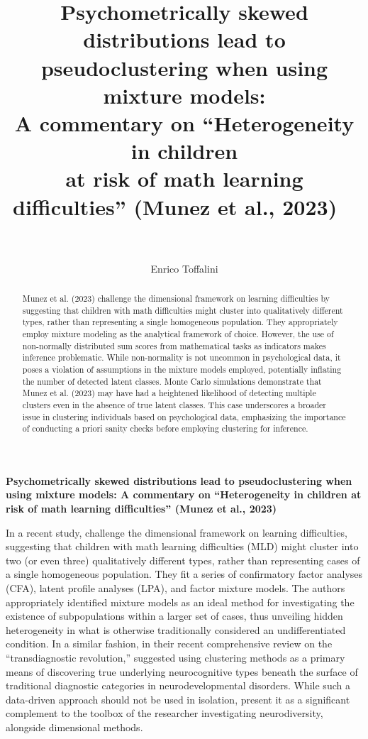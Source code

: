 \documentclass[letterpaper,11pt]{article}
\title{%
  \LARGE Psychometrically skewed distributions lead to pseudoclustering when using mixture models: \\ 
   \Large A commentary on “Heterogeneity in children \\ at risk of math learning difficulties” \large (Munez et al., 2023) 
  \ \\
  \ \\
}
\author{Enrico Toffalini}
\affil{Department of General Psychology, University of Padova, Italy}
\begin{document}
\maketitle
\newpage

\begin{abstract}
Munez et al. (2023) challenge the dimensional framework on learning difficulties by suggesting that children with math difficulties might cluster into qualitatively different types, rather than representing a single homogeneous population. They appropriately employ mixture modeling as the analytical framework of choice. However, the use of non-normally distributed sum scores from mathematical tasks as indicators makes inference problematic. While non-normality is not uncommon in psychological data, it poses a violation of assumptions in the mixture models employed, potentially inflating the number of detected latent classes. Monte Carlo simulations demonstrate that Munez et al. (2023) may have had a heightened likelihood of detecting multiple clusters even in the absence of true latent classes. This case underscores a broader issue in clustering individuals based on psychological data, emphasizing the importance of conducting a priori sanity checks before employing clustering for inference.
\end{abstract}

\newpage

\begin{center} 
\textbf{Psychometrically skewed distributions lead to pseudoclustering when using mixture models: A commentary on “Heterogeneity in children at risk of math learning difficulties” (Munez et al., 2023)}
\end{center}

In a recent study,  challenge the dimensional framework on learning difficulties, suggesting that children with math learning difficulties (MLD) might cluster into two (or even three) qualitatively different types, rather than representing cases of a single homogeneous population. They fit a series of confirmatory factor analyses (CFA), latent profile analyses (LPA), and factor mixture models. The authors appropriately identified mixture models as an ideal method for investigating the existence of subpopulations within a larger set of cases, thus unveiling hidden heterogeneity in what is otherwise traditionally considered an undifferentiated condition. In a similar fashion, in their recent comprehensive review on the “transdiagnostic revolution,”  suggested using clustering methods as a primary means of discovering true underlying neurocognitive types beneath the surface of traditional diagnostic categories in neurodevelopmental disorders. While such a data-driven approach should not be used in isolation,  present it as a significant complement to the toolbox of the researcher investigating neurodiversity, alongside dimensional methods.
\end{document}

